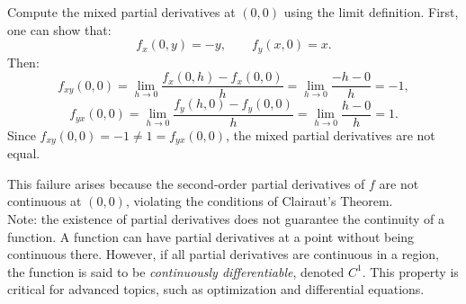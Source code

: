 \noindent Compute the mixed partial derivatives at \( (0, 0) \) using the limit definition. First, one can show that:
\[
f_x(0, y) = -y, \qquad f_y(x, 0) = x.
\]
Then:
\[
f_{xy}(0,0) = \lim_{h \to 0} \frac{f_x(0, h) - f_x(0, 0)}{h} = \lim_{h \to 0} \frac{-h - 0}{h} = -1,
\]
\[
f_{yx}(0,0) = \lim_{h \to 0} \frac{f_y(h, 0) - f_y(0, 0)}{h} = \lim_{h \to 0} \frac{h - 0}{h} = 1.
\]
Since \( f_{xy}(0,0) = -1 \neq 1 = f_{yx}(0,0) \), the mixed partial derivatives are not equal.

\noindent This failure arises because the second-order partial derivatives of \( f \) are not continuous at \( (0, 0) \), violating the conditions of Clairaut's Theorem. \\

\noindent Note: the existence of partial derivatives does not guarantee the continuity of a function. A function can have partial derivatives at a point without being continuous there. However, if all partial derivatives are continuous in a region, the function is said to be \textit{continuously differentiable}, denoted \( C^1 \). This property is critical for advanced topics, such as optimization and differential equations.

